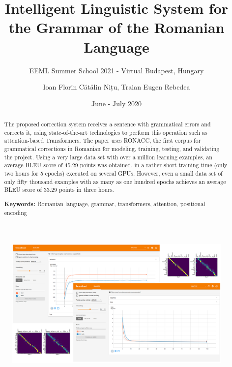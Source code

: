 \documentclass[]{beamer}
\title{Intelligent Linguistic System for the Grammar of the Romanian Language}
\subtitle{EEML Summer School 2021 - Virtual Budapest, Hungary}
\author{Ioan Florin Cătălin Nițu, Traian Eugen Rebedea}
\institute{University Politehnica of Bucharest}
\date{June - July 2020}
\providecommand{\keywords}[1]{
    \small
    \textbf{Keywords: } #1
}
\begin{document}
    
    \begin{frame}
        
        \maketitle
        
    \end{frame}
    
    \begin{abstract}
        
        The proposed correction system receives a sentence with grammatical errors and corrects it, using state-of-the-art technologies to perform this operation such as attention-based Transformers. The paper uses RONACC, the first corpus for grammatical corrections in Romanian for modeling, training, testing, and validating the project. Using a very large data set with over a million learning examples, an average BLEU score of 45.29 points was obtained, in a rather short training time (only two hours for 5 epochs) executed on several GPUs. However, even a small data set of only fifty thousand examples with as many as one hundred epochs achieves an average BLEU score of 33.29 points in three hours. \cite{nitu2020intelligent}
        
        \keywords{Romanian language, grammar, transformers, attention, positional encoding}
        
    \end{abstract}
    
    \begin{frame}
        
        \begin{figure}[]
            \centering
            \includegraphics[width=1.0\textwidth]{teaser.png}
            \label{fig:teaser}
        \end{figure}
        
    \end{frame}
    
\end{document}
